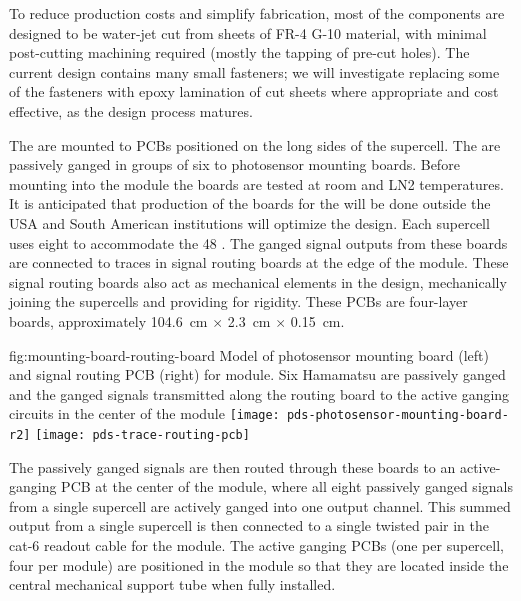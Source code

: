 To reduce production costs and simplify fabrication, most of the  components are designed to be water-jet cut from sheets of FR-4 G-10 material, with minimal post-cutting machining required (mostly the tapping of pre-cut holes).  The current design contains many small fasteners; we will investigate replacing some of the fasteners with epoxy lamination of cut sheets where appropriate and cost effective, as the design process matures.

The  are mounted to PCBs positioned on the long sides of the supercell.  
The  are passively ganged in groups of six to photosensor mounting boards.
 Before mounting into the  module the boards are tested at room and LN2 temperatures. It is anticipated that production of the boards for the  will be done outside the USA and South American institutions will optimize the design.
 Each supercell uses eight %
 to accommodate the 48 .  The ganged signal outputs from these boards are connected to traces in signal routing boards at the edge of the  module. These signal routing boards also act as mechanical elements in the design, mechanically joining the supercells and providing for rigidity.  These PCBs are four-layer boards, approximately \SI{104.6}{cm} $\times$ \SI{2.3}{cm} $\times$ \SI{0.15}{cm}.

 \begin{dunefigure}
 {fig:mounting-board-routing-board}
{Model of photosensor mounting board (left) and signal routing PCB (right) for  module.  Six Hamamatsu  are passively ganged and the ganged signals transmitted along the routing board to the active ganging circuits in the center of the module}
  \texttt{[image: pds-photosensor-mounting-board-r2]}
  \texttt{[image: pds-trace-routing-pcb]}
\end{dunefigure}
The passively ganged signals are then routed through these boards to an active-ganging PCB at the center of the module, where all eight passively ganged signals from a single supercell are actively ganged into one output channel. This summed output from a single supercell is then connected to a single twisted pair in the cat-6 readout cable for the module.  The active ganging PCBs (one per supercell, four per module) are positioned in the module so that they are located inside the central  mechanical support tube when fully installed.

